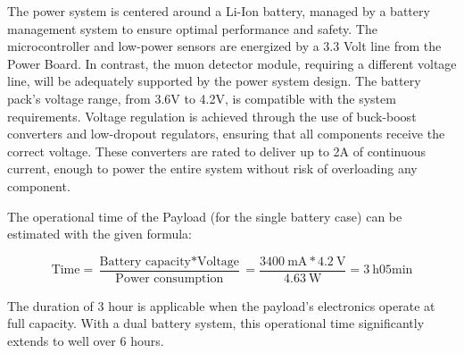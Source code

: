 The power system is centered around a Li-Ion battery, managed by a battery management system to ensure optimal performance and safety. The microcontroller and low-power sensors are energized by a 3.3 Volt line from the Power Board. In contrast, the muon detector module, requiring a different voltage line, will be adequately supported by the power system design. The battery pack's voltage range, from 3.6V to 4.2V, is compatible with the system requirements. Voltage regulation is achieved through the use of buck-boost converters and low-dropout regulators, ensuring that all components receive the correct voltage. These converters are rated to deliver up to 2A of continuous current, enough to power the entire system without risk of overloading any component.

The operational time of the Payload (for the single battery case) can be estimated with the given formula:

\begin{equation*}
\text{Time} = \frac{\text{Battery capacity} * \text{Voltage}}{\text{Power consumption}}=\frac{\SI{3400}{\milli\ampere} * \SI{4.2}{\volt}}{\SI{4.63}{\watt}} = \SI{3}{\hour} 
 05\text{min}
\end{equation*}

The duration of 3 hour is applicable when the payload's electronics operate at full capacity. With a dual battery system, this operational time significantly extends to well over 6 hours.

